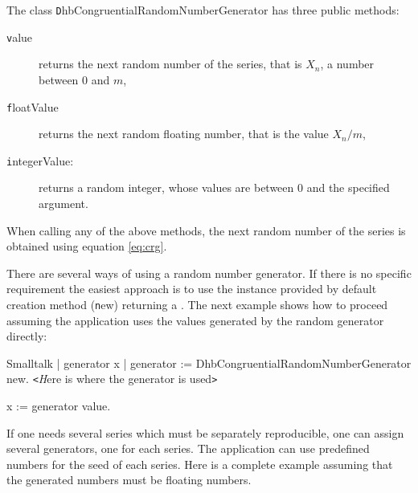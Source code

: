 \noindent The class {\texttt DhbCongruentialRandomNumberGenerator} has
three public methods:
\begin{description}
  \item[\texttt value] returns the next random number of the series,
  that is $X_n$, a number between $0$ and $m$,
  \item[\texttt floatValue] returns the next random floating number,
  that is the value $X_n / m$,
  \item[\texttt integerValue:] returns a random integer, whose values
  are between 0 and the specified argument.
\end{description}
When calling any of the above methods, the next random number of
the series is obtained using equation \ref{eq:crg}.

There are several ways of using a random number generator. If
there is no specific requirement the easiest approach is to use
the instance provided by default creation method ({\texttt new})
returning a . The next example shows how to
proceed assuming the application uses the values generated by the
random generator directly:
\begin{displaycode}{Smalltalk}
 | generator x |
 generator := DhbCongruentialRandomNumberGenerator new.
\hfil{\texttt <\textsl Here is where the generator is used\texttt
>}\hfil

 x := generator value.
\end{displaycode}

If one needs several series which must be separately reproducible,
one can assign several generators, one for each series. The
application can use predefined numbers for the seed of each
series. Here is a complete example assuming that the generated
numbers must be floating numbers.


